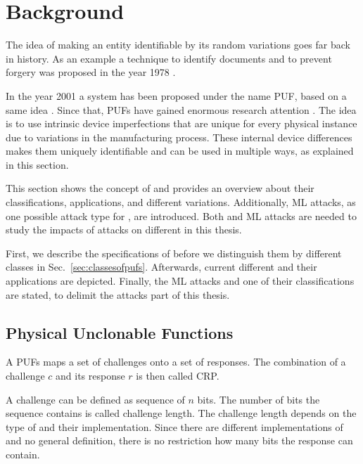 \chapter{Background}
\label{cap:background}

The idea of making an entity identifiable by its random variations goes far back in history.
As an example a technique to identify documents and to prevent forgery was proposed in the year 1978 \cite{Brosow1980MethodForgery}.%

In the year 2001 a system has been proposed under the name \acf{PUF}, based on a same idea \cite{Pappu2001PhysicalFunctions}.
Since that, \acp{PUF} have gained enormous research attention \cite{Becker2015ThePUFs}. %
The idea is to use intrinsic device imperfections that are unique for every physical instance due to variations in the manufacturing process.
These internal device differences makes them uniquely identifiable and can be used in multiple ways, as explained in this section.

This section shows the concept of \pufs and provides an overview about their classifications, applications, and different variations.
Additionally, \ac{ML} attacks, as one possible attack type for \pufs, are introduced.
Both \pufs and \ac{ML} attacks are needed to study the impacts of attacks on different \pufs in this thesis. %

First, we describe the specifications of \pufs before we distinguish them by different classes in Sec.\ \ref{sec:classesofpufs}.
Afterwards, current different \pufs and their applications are depicted.
Finally, the \ac{ML} attacks and one of their classifications are stated, to delimit the attacks part of this thesis.


\section{Physical Unclonable Functions}
\label{sec:pyhsicalunclonablefunctions}

A \acfp{PUF} maps a set of challenges onto a set of responses.
The combination of a challenge $c$ and its response $r$ is then called \ac{CRP}. %

A challenge can be defined as sequence of $n$ bits.
The number of bits the sequence contains is called challenge length. %
The challenge length depends on the type of \puf and their implementation.
Since there are different implementations of \pufs and no general definition, there is no restriction how many bits the response can contain. %

